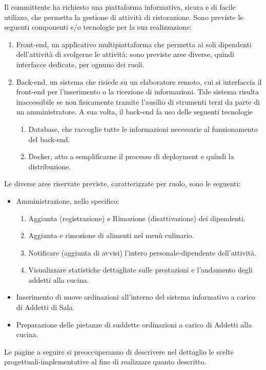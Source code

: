 Il committente ha richiesto una piattaforma informativa, sicura e di facile utilizzo, che permetta la gestione di attività di ristorazione. Sono previste le seguenti componenti e/o tecnologie per la sua realizzazione:
\begin{enumerate}
	\item Front-end, un applicativo multipiattaforma che permetta ai soli dipendenti dell'attività di svolgerne le attività; sono previste aree diverse, quindi interfacce dedicate, per ognuno dei ruoli.

	\item Back-end, un sistema che risiede su un elaboratore remoto, cui si interfaccia il front-end per l'inserimento o la ricezione di informazioni. Tale sistema risulta inaccessibile se non fisicamente tramite l'ausilio di strumenti terzi da parte di un amministratore. A sua volta, il back-end fa uso delle seguenti tecnologie
	\begin{enumerate}
		\item Database, che raccoglie tutte le informazioni necessarie al funzionamento del back-end.
		\item Docker, atto a semplificarne il processo di deployment e quindi la distribuzione.
	\end{enumerate}
\end{enumerate}

Le diverse aree riservate previste, caratterizzate per ruolo, sono le seguenti:
\begin{itemize}
	\item Amministrazione, nello specifico:
	\begin{enumerate}
		\item Aggiunta (registrazione) e Rimozione (disattivazione) dei dipendenti.
		\item Aggiunta e rimozione di alimenti nel menù culinario.
		\item Notificare (aggiunta di avvisi) l'intero personale-dipendente dell'attività.
		\item Visualizzare statistiche dettagliate sulle prestazioni e l'andamento degli addetti alla cucina.
	\end{enumerate}

	\item Inserimento di nuove ordinazioni all'interno del sistema informativo a carico di Addetti di Sala.
	\item Preparazione delle pietanze di suddette ordinazioni a carico di Addetti alla cucina.
\end{itemize}

Le pagine a seguire si preoccuperanno di descrivere nel dettaglio le scelte progettuali-implementative al fine di realizzare quanto descritto.
 
